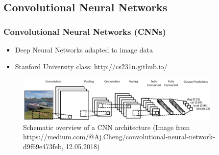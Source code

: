 \documentclass[aspectratio=43, notes]{beamer} 	%
\begin{document}
\subsection{Convolutional Neural Networks}
\begin{frame}
	\frametitle<presentation>{Convolutional Neural Networks (CNNs)}
	\begin{itemize}
		\item Deep Neural Networks adapted to image data
		\item Stanford University class: http://cs231n.github.io/ 
	\end{itemize}
	\begin{figure}[!t]
	\centering
		\includegraphics[width=0.9\textwidth]{bilder/cnn_overview.png}
	\caption{Schematic overview of a CNN architecture \hspace{\textwidth}
		\tiny (Image from https://medium.com/@Aj.Cheng/convolutional-neural-network-d9f69e473feb, 12.05.2018)}
	\label{fig:cnn_overview}
	\end{figure}
\end{frame}
\end{document}
